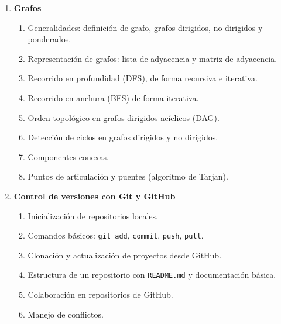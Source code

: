 \begin{enumerate}
  \item \textbf{Grafos}

  \begin{enumerate}
    \item \label{itm:4.1} Generalidades: definición de grafo, grafos dirigidos, no dirigidos y ponderados.
    \item \label{itm:4.2} Representación de grafos: lista de adyacencia y matriz de adyacencia.
    \item \label{itm:4.3} Recorrido en profundidad (DFS), de forma recursiva e iterativa.
    \item \label{itm:4.4} Recorrido en anchura (BFS) de forma iterativa.
    \item \label{itm:4.5} Orden topológico en grafos dirigidos acíclicos (DAG).
    \item \label{itm:4.6} Detección de ciclos en grafos dirigidos y no dirigidos.
    \item \label{itm:4.7} Componentes conexas.
    \item \label{itm:4.8} Puntos de articulación y puentes (algoritmo de Tarjan).
  \end{enumerate}

  \item \textbf{Control de versiones con Git y GitHub}

  \begin{enumerate}
    \item \label{itm:5.1} Inicialización de repositorios locales.
    \item \label{itm:5.2} Comandos básicos: \texttt{git add}, \texttt{commit}, \texttt{push}, \texttt{pull}.
    \item \label{itm:5.3} Clonación y actualización de proyectos desde GitHub.
    \item \label{itm:5.4} Estructura de un repositorio con \texttt{README.md} y documentación básica.
    \item \label{itm:5.5} Colaboración en repositorios de GitHub.
    \item \label{itm:5.6} Manejo de conflictos.
  \end{enumerate}

\end{enumerate}


